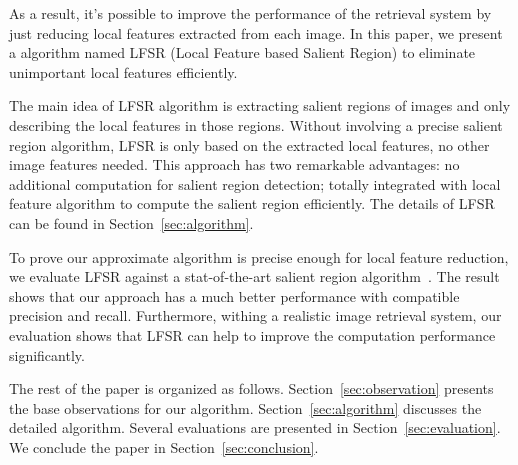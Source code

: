 As a result, it's possible to improve the performance of the retrieval system by just reducing local features extracted from each image. In this paper, we present a algorithm named LFSR (Local Feature based Salient Region) to eliminate unimportant local features efficiently.

The main idea of LFSR algorithm is extracting salient regions of images and only describing the local features in those regions. Without involving a precise salient region algorithm, LFSR is only based on the extracted local features, no other image features needed. This approach has two remarkable advantages: no additional computation for salient region detection; totally integrated with local feature algorithm to compute the salient region efficiently. The details of LFSR can be found in Section~\ref{sec:algorithm}. 

To prove our approximate algorithm is precise enough for local feature reduction, we evaluate LFSR against a stat-of-the-art salient region algorithm~\cite{achanta2009frequency}. The result shows that our approach has a much better performance with compatible precision and recall. Furthermore, withing a realistic image retrieval system, our evaluation shows that LFSR can help to improve the computation performance significantly.

The rest of the paper is organized as follows. Section~\ref{sec:observation} presents the base observations for our algorithm. Section~\ref{sec:algorithm} discusses the detailed algorithm. Several evaluations are presented in Section~\ref{sec:evaluation}. We conclude the paper in Section~\ref{sec:conclusion}.